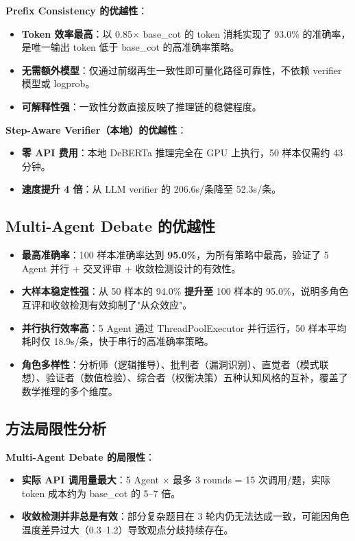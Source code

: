 \documentclass[lang=cn,a4paper,newtx]{elegantpaper}
\begin{document}
\textbf{Prefix Consistency 的优越性}：

\begin{itemize}
  \item \textbf{Token 效率最高}：以 0.85$\times$ base\_cot 的 token 消耗实现了 93.0\% 的准确率，是唯一输出 token 低于 base\_cot 的高准确率策略。
  \item \textbf{无需额外模型}：仅通过前缀再生一致性即可量化路径可靠性，不依赖 verifier 模型或 logprob。
  \item \textbf{可解释性强}：一致性分数直接反映了推理链的稳健程度。
\end{itemize}

\textbf{Step-Aware Verifier（本地）的优越性}：

\begin{itemize}
  \item \textbf{零 API 费用}：本地 DeBERTa 推理完全在 GPU 上执行，50 样本仅需约 43 分钟。
  \item \textbf{速度提升 4 倍}：从 LLM verifier 的 206.6s/条降至 52.3s/条。
\end{itemize}

\subsection{Multi-Agent Debate 的优越性}

\begin{itemize}
  \item \textbf{最高准确率}：100 样本准确率达到 \textbf{95.0\%}，为所有策略中最高，验证了 5 Agent 并行 + 交叉评审 + 收敛检测设计的有效性。
  \item \textbf{大样本稳定性强}：从 50 样本的 94.0\% \textbf{提升至} 100 样本的 95.0\%，说明多角色互评和收敛检测有效抑制了"从众效应"。
  \item \textbf{并行执行效率高}：5 Agent 通过 ThreadPoolExecutor 并行运行，50 样本平均耗时仅 18.9s/条，快于串行的高准确率策略。
  \item \textbf{角色多样性}：分析师（逻辑推导）、批判者（漏洞识别）、直觉者（模式联想）、验证者（数值检验）、综合者（权衡决策）五种认知风格的互补，覆盖了数学推理的多个维度。
\end{itemize}

\subsection{方法局限性分析}

\textbf{Multi-Agent Debate 的局限性}：

\begin{itemize}
  \item \textbf{实际 API 调用量最大}：5 Agent $\times$ 最多 3 rounds = 15 次调用/题，实际 token 成本约为 base\_cot 的 5--7 倍。
  \item \textbf{收敛检测并非总是有效}：部分复杂题目在 3 轮内仍无法达成一致，可能因角色温度差异过大（0.3--1.2）导致观点分歧持续存在。
\end{itemize}
\end{document}
